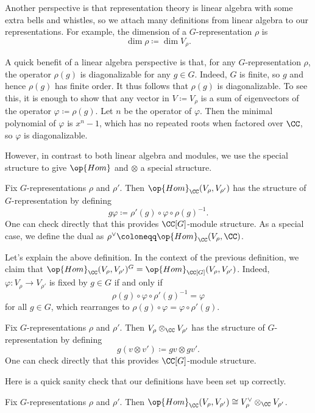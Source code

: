 \documentclass{article}
\begin{document}
Another perspective is that representation theory is linear algebra with some extra bells and whistles, so we attach many definitions from linear algebra to our representations. For example, the dimension of a $G$-representation $\rho$ is
\[\dim\rho\coloneqq\dim V_\rho.\]
\begin{remark} \label{rem:reps-are-diagonalizable}
	A quick benefit of a linear algebra perspective is that, for any $G$-representation $\rho$, the operator $\rho(g)$ is diagonalizable for any $g\in G$. Indeed, $G$ is finite, so $g$ and hence $\rho(g)$ has finite order. It thus follows that $\rho(g)$ is diagonalizable. To see this, it is enough to show that any vector in $V\coloneqq V_\rho$ is a sum of eigenvectors of the operator $\varphi\coloneqq\rho(g)$. Let $n$ be the operator of $\varphi$. Then the minimal polynomial of $\varphi$ is $x^n-1$, which has no repeated roots when factored over $\CC$, so $\varphi$ is diagonalizable.
\end{remark}
However, in contrast to both linear algebra and modules, we use the special structure to give $\op{Hom}$ and $\otimes$ a special structure.
\begin{definition}
	Fix $G$-representations $\rho$ and $\rho'$. Then $\op{Hom}_\CC(V_\rho,V_{\rho'})$ has the structure of $G$-representation by defining
	\[g\varphi\coloneqq\rho'(g)\circ\varphi\circ\rho(g)^{-1}.\]
	One can check directly that this provides $\CC[G]$-module structure. As a special case, we define the dual as $\rho^\lor\coloneqq\op{Hom}_\CC(V_\rho,\CC)$.
\end{definition}
\begin{remark} \label{rem:hom-invariants}
	Let's explain the above definition. In the context of the previous definition, we claim that $\op{Hom}_\CC(V_\rho,V_{\rho'})^G=\op{Hom}_{\CC[G]}(V_\rho,V_{\rho'})$. Indeed, $\varphi\colon V_\rho\to V_{\rho'}$ is fixed by $g\in G$ if and only if
	\[\rho(g)\circ\varphi\circ\rho'(g)^{-1}=\varphi\]
	for all $g\in G$, which rearranges to $\rho(g)\circ\varphi=\varphi\circ\rho'(g)$.
\end{remark}
\begin{definition}
	Fix $G$-representations $\rho$ and $\rho'$. Then $V_\rho\otimes_\CC V_{\rho'}$ has the structure of $G$-representation by defining
	\[g(v\otimes v')\coloneqq gv\otimes gv'.\]
	One can check directly that this provides $\CC[G]$-module structure.
\end{definition}
Here is a quick sanity check that our definitions have been set up correctly.
\begin{lemma} \label{lem:hom-is-dual-tensor}
	Fix $G$-representations $\rho$ and $\rho'$. Then $\op{Hom}_\CC(V_\rho,V_{\rho'})\cong V_\rho^\lor\otimes_\CC V_{\rho'}$.
\end{lemma}
\end{document}
